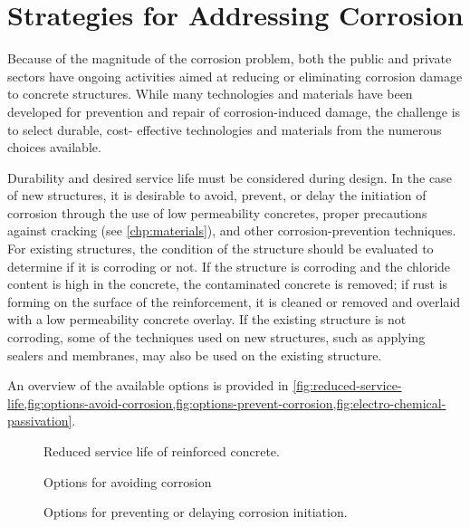 \section{Strategies for Addressing Corrosion}
\label{sec:strategy-address-corrosion}
Because of the magnitude of the corrosion problem, both the public and private sectors have ongoing activities
aimed at reducing or eliminating corrosion damage to concrete structures. While many technologies and materials
have been developed for prevention and repair of corrosion-induced damage, the challenge is to select durable, cost-
effective technologies and materials from the numerous choices available.

Durability and desired service life must be considered during design. In the case of new structures, it is desirable
to avoid, prevent, or delay the initiation of corrosion through the use of low permeability concretes, proper
precautions against cracking (see \cref{chp:materials}), and other corrosion-prevention techniques. For existing structures, the
condition of the structure should be evaluated to determine if it is corroding or not. If the structure is corroding and
the chloride content is high in the concrete, the contaminated concrete is removed; if rust is forming on the surface of
the reinforcement, it is cleaned or removed and overlaid with a low permeability concrete overlay. If the existing
structure is not corroding, some of the techniques used on new structures, such as applying sealers and membranes,
may also be used on the existing structure.

An overview of the available options is provided in \cref{fig:reduced-service-life,fig:options-avoid-corrosion,fig:options-prevent-corrosion,fig:electro-chemical-passivation}.

\begin{figure}
  \caption{Reduced service life of reinforced concrete.}
  \label{fig:reduced-service-life}
\end{figure}

\begin{figure}
  \caption{Options for avoiding corrosion}
  \label{fig:options-avoid-corrosion}
\end{figure}

\begin{figure}
  \caption{Options for preventing or delaying corrosion initiation.}
  \label{fig:options-prevent-corrosion}
\end{figure}

